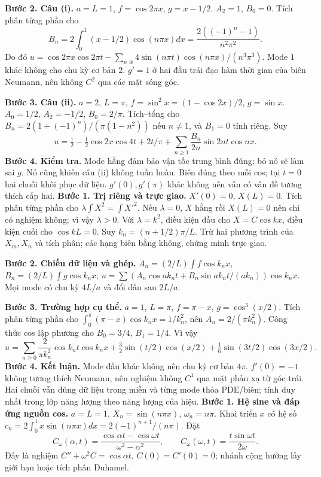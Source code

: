 \textbf{Bước 2. Câu (i).} $a=L=1$, $f=\cos2\pi x$, $g=x-1/2$. $A_2=1$, $B_0=0$. Tích phân từng phần cho
\[B_n=2\int_0^1(x-1/2)\cos(n\pi x)dx=\frac{2((-1)^n-1)}{n^2\pi^2}.\]
Do đó $u=\cos2\pi x\cos2\pi t-\sum_{n\text{ lẻ}}4\sin(n\pi t)\cos(n\pi x)/(n^3\pi^3)$. Mode $1$ khác không cho chu kỳ cơ bản $2$. $g'=1$ ở hai đầu trái đạo hàm thời gian của biên Neumann, nên không $C^2$ qua các mặt sóng góc.

\textbf{Bước 3. Câu (ii).} $a=2$, $L=\pi$, $f=\sin^2x=(1-\cos2x)/2$, $g=\sin x$. $A_0=1/2$, $A_2=-1/2$, $B_0=2/\pi$. Tích–tổng cho $B_n=2(1+(-1)^n)/(\pi(1-n^2))$ nếu $n\ne1$, và $B_1=0$ tính riêng. Suy
\[u=\tfrac12-\tfrac12\cos2x\cos4t+2t/\pi+\sum_{n\ge1}\frac{B_n}{2n}\sin2nt\cos nx.\]
\textbf{Bước 4. Kiểm tra.} Mode hằng đảm bảo vận tốc trung bình đúng; bỏ nó sẽ làm sai $g$. Nó cũng khiến câu (ii) không tuần hoàn. Biên đúng theo mỗi cos; tại $t=0$ hai chuỗi khôi phục dữ liệu. $g'(0),g'(\pi)$ khác không nên vẫn có vấn đề tương thích cấp hai.
\textbf{Bước 1. Trị riêng và trực giao.} $X'(0)=0$, $X(L)=0$. Tích phân từng phần cho $\lambda\int X^2=\int X'^2$. Nếu $\lambda=0$, $X$ hằng rồi $X(L)=0$ nên chỉ có nghiệm không; vì vậy $\lambda>0$. Với $\lambda=k^2$, điều kiện đầu cho $X=C\cos kx$, điều kiện cuối cho $\cos kL=0$. Suy $k_n=(n+1/2)\pi/L$. Trừ hai phương trình của $X_m,X_n$ và tích phân; các hạng biên bằng không, chứng minh trực giao.

\textbf{Bước 2. Chiếu dữ liệu và ghép.} $A_n=(2/L)\int f\cos k_nx$, $B_n=(2/L)\int g\cos k_nx$; $u=\sum(A_n\cos ak_nt+B_n\sin ak_nt/(ak_n))\cos k_nx$. Mọi mode có chu kỳ $4L/a$ và đổi dấu sau $2L/a$.

\textbf{Bước 3. Trường hợp cụ thể.} $a=1$, $L=\pi$, $f=\pi-x$, $g=\cos^3(x/2)$. Tích phân từng phần cho $\int_0^\pi(\pi-x)\cos k_nx=1/k_n^2$, nên $A_n=2/(\pi k_n^2)$. Công thức cos lập phương cho $B_0=3/4$, $B_1=1/4$. Vì vậy
\[u=\sum_{n\ge0}\frac2{\pi k_n^2}\cos k_nt\cos k_nx
+\tfrac32\sin(t/2)\cos(x/2)+\tfrac16\sin(3t/2)\cos(3x/2).\]
\textbf{Bước 4. Kết luận.} Mode đầu khác không nên chu kỳ cơ bản $4\pi$. $f'(0)=-1$ không tương thích Neumann, nên nghiệm không $C^1$ qua mặt phản xạ từ góc trái. Hai chuỗi vẫn đúng dữ liệu trong miền và từng mode thỏa PDE/biên; tính duy nhất trong lớp năng lượng theo năng lượng của hiệu.
\textbf{Bước 1. Hệ sine và đáp ứng nguồn cos.} $a=L=1$, $X_n=\sin(n\pi x)$, $\omega_n=n\pi$. Khai triển $x$ có hệ số $c_n=2\int_0^1x\sin(n\pi x)dx=2(-1)^{n+1}/(n\pi)$. Đặt
\[C_\omega(\alpha,t)=\frac{\cos\alpha t-\cos\omega t}{\omega^2-\alpha^2},\qquad
C_\omega(\omega,t)=\frac{t\sin\omega t}{2\omega}.\]
Đây là nghiệm $C''+\omega^2C=\cos\alpha t$, $C(0)=C'(0)=0$; nhánh cộng hưởng lấy giới hạn hoặc tích phân Duhamel.

